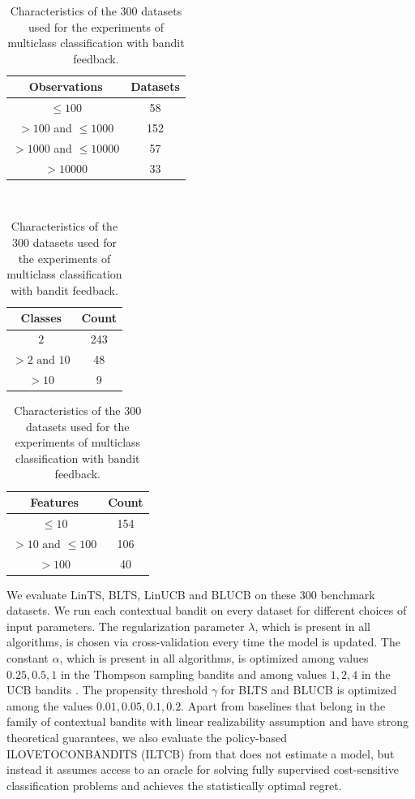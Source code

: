 \documentclass[letterpaper]{article} %
\begin{document}
\begin{table}[H]
\centering
\begin{tabular}{|c|c|}
\hline
Observations & Datasets \\
\hline
$\leq 100$ & 58 \\
\hline
$> 100$ and $\leq 1000$  & 152  \\
\hline
$> 1000$ and $\leq 10000$ & 57  \\
\hline
$> 10000$ & 33 \\
\hline
\end{tabular}
\\ %
\begin{tabular}{|c|c|}
\hline
Classes & Count \\
\hline
$2$ & 243 \\
\hline
$> 2 \text{ and } 10$  & 48  \\
\hline
$ > 10 $ & 9  \\
\hline
\end{tabular}
\hspace{5pt}
\begin{tabular}{|c|c|}
\hline
Features & Count \\
\hline
$\leq 10$ & 154 \\
\hline
$> 10 \text{ and } \leq 100$  & 106  \\
\hline
$> 100$  & 40  \\
\hline
\end{tabular}
\caption{Characteristics of the 300 datasets used for the experiments of multiclass classification with bandit feedback.}
\label{stats}
\end{table}

We evaluate LinTS, BLTS, LinUCB and BLUCB on these 300 benchmark datasets. We run each contextual bandit on every dataset for different choices of input parameters. The regularization parameter $\lambda$, which is present in all algorithms, is chosen via cross-validation every time the model is updated. The constant $\alpha$, which is present in all algorithms, is optimized among values $0.25, 0.5, 1$ in the Thompson sampling bandits \cite{chapelle-tsucb} and among values $1, 2, 4$ in the UCB bandits \cite{chapelle-tsucb}. The propensity threshold $\gamma$ for BLTS and BLUCB is optimized among the values $0.01, 0.05, 0.1, 0.2$.
Apart from baselines that belong in the family of contextual bandits with linear realizability assumption and have strong theoretical guarantees, we also evaluate the policy-based ILOVETOCONBANDITS (ILTCB) from \cite{agarwal-ilovetoconbandits} that does not estimate a model, but instead it assumes access to an oracle for solving fully supervised cost-sensitive classification problems and achieves the statistically optimal regret.
\end{document}
